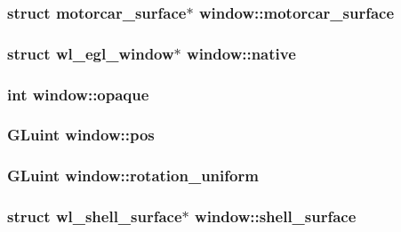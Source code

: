 \hypertarget{structwindow_a0be16829aad611ea0be83bd985b07302}{
\subsubsection[{motorcar\-\_\-surface}]{\setlength{\rightskip}{0pt plus 5cm}struct motorcar\-\_\-surface$\ast$ window\-::motorcar\-\_\-surface}}\label{structwindow_a0be16829aad611ea0be83bd985b07302}
\hypertarget{structwindow_ae41be0955d0e73530e1bc13dfeb9d731}{
\subsubsection[{native}]{\setlength{\rightskip}{0pt plus 5cm}struct wl\-\_\-egl\-\_\-window$\ast$ window\-::native}}\label{structwindow_ae41be0955d0e73530e1bc13dfeb9d731}
\hypertarget{structwindow_a026a50808d8323a5a73d585c19916fa8}{
\subsubsection[{opaque}]{\setlength{\rightskip}{0pt plus 5cm}int window\-::opaque}}\label{structwindow_a026a50808d8323a5a73d585c19916fa8}
\hypertarget{structwindow_aaf965f90f9fc938db2315ff62028c362}{
\subsubsection[{pos}]{\setlength{\rightskip}{0pt plus 5cm}G\-Luint window\-::pos}}\label{structwindow_aaf965f90f9fc938db2315ff62028c362}
\hypertarget{structwindow_a5202f3b60e262a6fa4fcee68dd47cb67}{
\subsubsection[{rotation\-\_\-uniform}]{\setlength{\rightskip}{0pt plus 5cm}G\-Luint window\-::rotation\-\_\-uniform}}\label{structwindow_a5202f3b60e262a6fa4fcee68dd47cb67}
\hypertarget{structwindow_ae4cdc06e4406bc9c168e4a71dcba1103}{
\subsubsection[{shell\-\_\-surface}]{\setlength{\rightskip}{0pt plus 5cm}struct wl\-\_\-shell\-\_\-surface$\ast$ window\-::shell\-\_\-surface}}\label{structwindow_ae4cdc06e4406bc9c168e4a71dcba1103}
